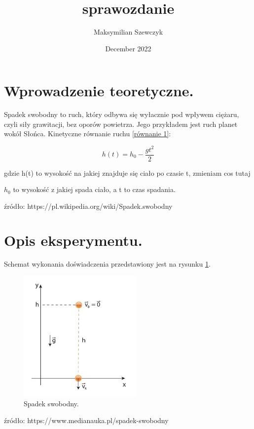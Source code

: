 \documentclass{article}
\title{sprawozdanie}
\author{Maksymilian Szewczyk}
\date{December 2022}
\begin{document}
\maketitle

\section{Wprowadzenie teoretyczne.}

Spadek swobodny to ruch, który odbywa się wyłacznie pod wpływem ciężaru, czyli siły grawitacji, bez oporów powietrza. Jego przykładem jest ruch planet wokół Słońca. Kinetyczne równanie ruchu \ref{równanie 1}:

\begin{equation}
\label{równanie 1}
    h(t) = h_0 - \frac{gt^2}{2}
\end{equation}    


gdzie h(t) to wysokość na jakiej znajduje się ciało po czasie t, zmieniam cos tutaj

$h_0$ to wysokość z jakiej spada ciało, a t to czas spadania.

\vspace{5mm} %

źródło: https://pl.wikipedia.org/wiki/Spadek.swobodny

\section{Opis eksperymentu.}

Schemat wykonania doświadczenia przedstawiony jest na rysunku \ref{spadek.swobodny}.

\begin{figure}[htbp]
\includegraphics[width=6cm]{zdj.jpg}
\centering
\caption{Spadek swobodny.}
\label{spadek.swobodny}
\end{figure}

\vspace{5mm} %
źródło: https://www.medianauka.pl/spadek-swobodny 
\end{document}
